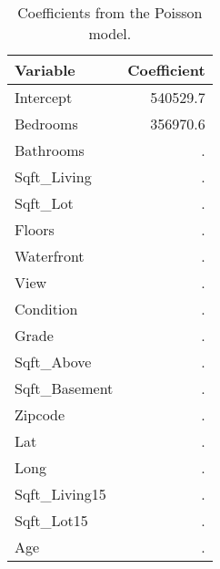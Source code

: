 \documentclass[a4paper, 8pt]{article}
\begin{document}
\begin{table}[ht]
\centering
\begin{tabular}{|l | r|}
\hline
\textbf{Variable} & \textbf{Coefficient} \\
\hline
Intercept     & 540529.7 \\
Bedrooms      & 356970.6 \\
Bathrooms     & . \\
Sqft\_Living   & . \\
Sqft\_Lot      & . \\
Floors        & . \\
Waterfront    & . \\
View          & . \\
Condition     & . \\
Grade         & . \\
Sqft\_Above    & . \\
Sqft\_Basement & . \\
Zipcode       & . \\
Lat           & . \\
Long          & . \\
Sqft\_Living15 & . \\
Sqft\_Lot15    & . \\
Age           & . \\
\hline
\end{tabular}
\caption{Coefficients from the Poisson model.}
\label{glmcoefs}
\end{table}


% 
% 
\end{document}

